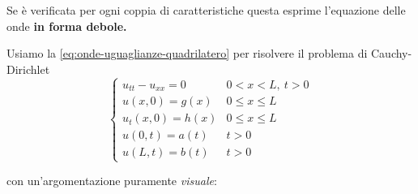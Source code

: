 \documentclass[10pt,a4paper,twoside,openright]{book}
\begin{document}
\begin{enumerate}
	Se è verificata per ogni coppia di caratteristiche questa esprime l'equazione delle onde \textbf{in forma debole.}

	Usiamo la \eqref{eq:onde-uguaglianze-quadrilatero} per risolvere il problema di Cauchy-Dirichlet
	\begin{equation*}
		\begin{cases}
			u_{tt} -u_{xx} =0  & 0< x< L,\ t >0          \\
			u(x,0) =g(x)     & 0\leqslant x\leqslant L \\
			u_{t}(x,0) =h(x) & 0\leqslant x\leqslant L \\
			u(0,t) =a(t)     & t >0                    \\
			u(L,t) =b(t)     & t >0                    
		\end{cases}
	\end{equation*}

	con un'argomentazione puramente \textit{visuale}:

	\begin{figure}[htpb]
		\centering
		
		\begin{tikzpicture}[x=0.75pt,y=0.75pt,yscale=-1,xscale=1]
			

\end{tikzpicture}
\end{figure}
\end{enumerate}
\end{document}
